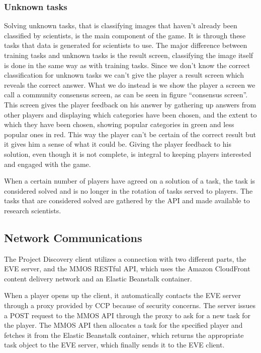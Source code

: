 \subsubsection{Unknown tasks}
Solving unknown tasks, that is classifying images that haven't already been classified by scientists, is the main component of the game. It is through these tasks that data is generated for scientists to use. The major difference between training tasks and unknown tasks is the result screen, classifying the image itself is done in the same way as with training tasks. Since we don't know the correct classification for unknown tasks we can't give the player a result screen which reveals the correct answer. What we do instead is we show the player a screen we call a community consensus screen, as can be seen in figure ``consensus screen''. This screen gives the player feedback on his answer by gathering up answers from other players and displaying which categories have been chosen, and the extent to which they have been chosen, showing popular categories in green and less popular ones in red. This way the player can't be certain of the correct result but it gives him a sense of what it could be. Giving the player feedback to his solution, even though it is not complete, is integral to keeping players interested and engaged with the game.

When a certain number of players have agreed on a solution of a task, the task is considered solved and is no longer in the rotation of tasks served to players. The tasks that are considered solved are gathered by the API and made available to research scientists.


\subsection{Network Communications}
The Project Discovery client utilizes a connection with two different parts, the EVE server, and the MMOS RESTful API, which uses the Amazon CloudFront content delivery network and an Elastic Beanstalk container.

When a player opens up the client, it automatically contacts the EVE server through a proxy provided by CCP because of security concerns. The server issues a POST request to the MMOS API through the proxy to ask for a new task for the player. The MMOS API then allocates a task for the specified player and fetches it from the Elastic Beanstalk container, which returns the appropriate task object to the EVE server, which finally sends it to the EVE client. 

